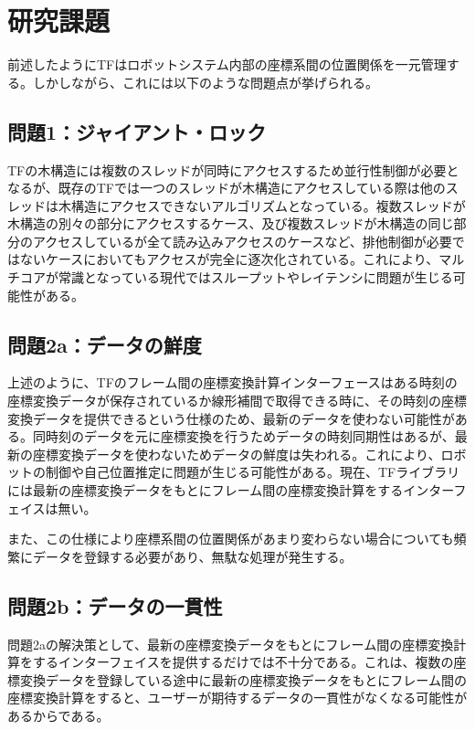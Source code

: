 \documentclass[a4paper]{jreport}	%
\begin{document}
\section{研究課題}
前述したようにTFはロボットシステム内部の座標系間の位置関係を一元管理する。しかしながら、これには以下のような問題点が挙げられる。

\subsection*{問題1：ジャイアント・ロック}
TFの木構造には複数のスレッドが同時にアクセスするため並行性制御が必要となるが、既存のTFでは一つのスレッドが木構造にアクセスしている際は他のスレッドは木構造にアクセスできないアルゴリズムとなっている。複数スレッドが木構造の別々の部分にアクセスするケース、及び複数スレッドが木構造の同じ部分のアクセスしているが全て読み込みアクセスのケースなど、排他制御が必要ではないケースにおいてもアクセスが完全に逐次化されている。これにより、マルチコアが常識となっている現代ではスループットやレイテンシに問題が生じる可能性がある。

\subsection*{問題2a：データの鮮度}
上述のように、TFのフレーム間の座標変換計算インターフェースはある時刻の座標変換データが保存されているか線形補間で取得できる時に、その時刻の座標変換データを提供できるという仕様のため、最新のデータを使わない可能性がある。同時刻のデータを元に座標変換を行うためデータの時刻同期性はあるが、最新の座標変換データを使わないためデータの鮮度は失われる。これにより、ロボットの制御や自己位置推定に問題が生じる可能性がある。現在、TFライブラリには最新の座標変換データをもとにフレーム間の座標変換計算をするインターフェイスは無い。

また、この仕様により座標系間の位置関係があまり変わらない場合についても頻繁にデータを登録する必要があり、無駄な処理が発生する。

\subsection*{問題2b：データの一貫性}
問題2aの解決策として、最新の座標変換データをもとにフレーム間の座標変換計算をするインターフェイスを提供するだけでは不十分である。これは、複数の座標変換データを登録している途中に最新の座標変換データをもとにフレーム間の座標変換計算をすると、ユーザーが期待するデータの一貫性がなくなる可能性があるからである。

\end{document}
